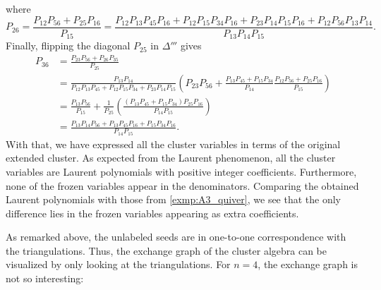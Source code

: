 \begin{example}
\begin{equation*}
	\end{equation*}
	where
	\begin{equation*}
		P_{26} = \frac{P_{12}P_{56} + P_{25}P_{16}}{P_{15}} = \frac{P_{12}P_{13}P_{45}P_{16} + P_{12}P_{15}P_{34}P_{16}+P_{23}P_{14}P_{15}P_{16} + P_{12}P_{56}P_{13}P_{14}}{P_{13}P_{14}P_{15}}.
	\end{equation*}
	Finally, flipping the diagonal $P_{25}$ in $\Delta'''$ gives
	\begin{align*}
		P_{36}
		 & = \frac{P_{23}P_{56} + P_{26}P_{35}}{P_{25}}                                                                                                                                                      \\
		 & = \frac{P_{13}P_{14}}{P_{12}P_{13}P_{45} + P_{12}P_{15}P_{34}+P_{23}P_{14}P_{15}}\left(P_{23}P_{56} + \frac{P_{13}P_{45} + P_{15}P_{34}}{P_{14}}\frac{P_{12}P_{56} + P_{25}P_{16}}{P_{15}}\right) \\
		 & = \frac{P_{13}P_{56}}{P_{15}} + \frac{1}{P_{25}}\left(\frac{(P_{13}P_{45} + P_{15}P_{34})P_{25}P_{16}}{P_{14}P_{15}}\right)                                                                       \\
		 & =\frac{P_{13}P_{14}P_{56} + P_{13}P_{45}P_{16} + P_{15}P_{34}P_{16}}{P_{14}P_{15}}.
	\end{align*}
	With that, we have expressed all the cluster variables in terms of the original
	extended cluster. As expected from the Laurent phenomenon, all the cluster variables
	are Laurent polynomials with positive integer coefficients. Furthermore, none of the
	frozen variables appear in the denominators. Comparing the obtained Laurent polynomials
	with those from \cref{exmp:A3_quiver}, we see that the only difference lies in the
	frozen variables appearing as extra coefficients.

	As remarked above, the unlabeled seeds are in one-to-one correspondence with the
	triangulations. Thus, the exchange graph of the cluster algebra can be visualized by
	only looking at the triangulations. For $n = 4$, the exchange graph is not so
	interesting:
	\begin{center}
\end{center}
\end{example}
